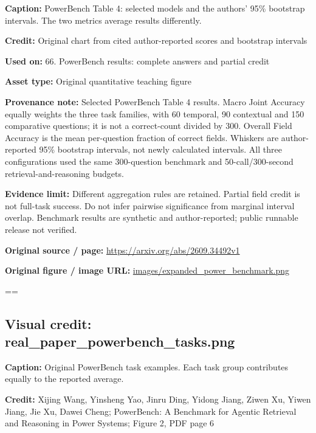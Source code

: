 \documentclass[10pt,letterpaper]{article}
\begin{document}
\textbf{Caption:} PowerBench Table 4: selected models and the authors' 95\% bootstrap intervals. The two metrics average results differently.\par
\textbf{Credit:} Original chart from cited author-reported scores and bootstrap intervals\par
\textbf{Used on:} 66. PowerBench results: complete answers and partial credit\par
\textbf{Asset type:} Original quantitative teaching figure\par
\textbf{Provenance note:} Selected PowerBench Table 4 results. Macro Joint Accuracy equally weights the three task families, with 60 temporal, 90 contextual and 150 comparative questions; it is not a correct-count divided by 300. Overall Field Accuracy is the mean per-question fraction of correct fields. Whiskers are author-reported 95\% bootstrap intervals, not newly calculated intervals. All three configurations used the same 300-question benchmark and 50-call/300-second retrieval-and-reasoning budgets.\par
\textbf{Evidence limit:} Different aggregation rules are retained. Partial field credit is not full-task success. Do not infer pairwise significance from marginal interval overlap. Benchmark results are synthetic and author-reported; public runnable release not verified.\par
\textbf{Original source / page:} \href{https://arxiv.org/abs/2609.34492v1}{\small\ttfamily https:/\allowbreak{}/\allowbreak{}arxiv.\allowbreak{}org/\allowbreak{}abs/\allowbreak{}2609.\allowbreak{}34492v1}\par
\textbf{Original figure / image URL:} \href{images/expanded_power_benchmark.png}{\small\ttfamily images/\allowbreak{}expanded\_\allowbreak{}power\_\allowbreak{}benchmark.\allowbreak{}png}\par
\egroup\par\noindent\box\readingEntry\par\medskip
\setbox\readingEntry=\vbox\bgroup\hsize=\linewidth\subsection*{Visual credit: real\_paper\_powerbench\_tasks.png}
\textbf{Caption:} Original PowerBench task examples. Each task group contributes equally to the reported average.\par
\textbf{Credit:} Xijing Wang, Yinsheng Yao, Jinru Ding, Yidong Jiang, Ziwen Xu, Yiwen Jiang, Jie Xu, Dawei Cheng; PowerBench: A Benchmark for Agentic Retrieval and Reasoning in Power Systems; Figure 2, PDF page 6\par
\end{document}
